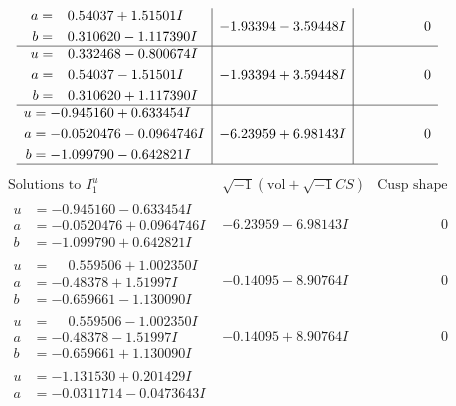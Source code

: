 \documentclass[1p]{elsarticle_modified}
\theoremstyle{definition}
\newcommand{\I}{\sqrt{-1}}
\begin{document}
$$\begin{array}{c|c|c}
\begin{aligned}
a &= \phantom{-}0.54037 + 1.51501 I \\
b &= \phantom{-}0.310620 - 1.117390 I\end{aligned}
 & -1.93394 - 3.59448 I & \phantom{-0.000000 } 0 \\ \hline\begin{aligned}
u &= \phantom{-}0.332468 - 0.800674 I \\
a &= \phantom{-}0.54037 - 1.51501 I \\
b &= \phantom{-}0.310620 + 1.117390 I\end{aligned}
 & -1.93394 + 3.59448 I & \phantom{-0.000000 } 0 \\ \hline\begin{aligned}
u &= -0.945160 + 0.633454 I \\
a &= -0.0520476 - 0.0964746 I \\
b &= -1.099790 - 0.642821 I\end{aligned}
 & -6.23959 + 6.98143 I & \phantom{-0.000000 } 0\\
 \hline 
 \end{array}$$\newpage$$\begin{array}{c|c|c}  
\text{Solutions to }I^u_{1}& \I (\text{vol} + \sqrt{-1}CS) & \text{Cusp shape}\\
 \hline 
\begin{aligned}
u &= -0.945160 - 0.633454 I \\
a &= -0.0520476 + 0.0964746 I \\
b &= -1.099790 + 0.642821 I\end{aligned}
 & -6.23959 - 6.98143 I & \phantom{-0.000000 } 0 \\ \hline\begin{aligned}
u &= \phantom{-}0.559506 + 1.002350 I \\
a &= -0.48378 + 1.51997 I \\
b &= -0.659661 - 1.130090 I\end{aligned}
 & -0.14095 - 8.90764 I & \phantom{-0.000000 } 0 \\ \hline\begin{aligned}
u &= \phantom{-}0.559506 - 1.002350 I \\
a &= -0.48378 - 1.51997 I \\
b &= -0.659661 + 1.130090 I\end{aligned}
 & -0.14095 + 8.90764 I & \phantom{-0.000000 } 0 \\ \hline\begin{aligned}
u &= -1.131530 + 0.201429 I \\
a &= -0.0311714 - 0.0473643 I \\

\end{aligned}
\end{array}$$
\end{document}
